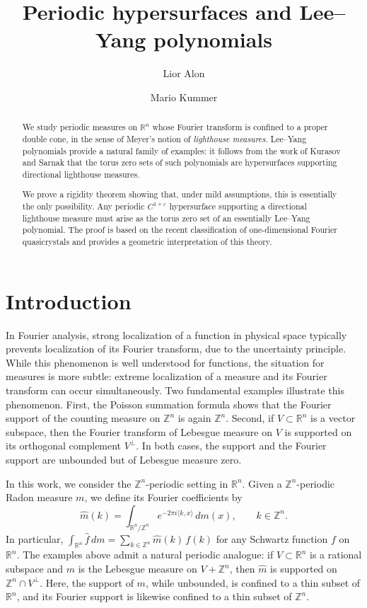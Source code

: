 \documentclass[11pt,letterpaper]{amsart}
\title[Periodic hypersurfaces and Lee--Yang polynomials]{Periodic hypersurfaces and Lee--Yang polynomials}
\author{Lior Alon}
\author{Mario Kummer}
\theoremstyle{definition}
\theoremstyle{plain}
\newcommand{\R}{{\mathbb R}}
\newcommand{\Z}{{\mathbb Z}}
\begin{document}
\begin{abstract}
We study periodic measures on $\R^n$ whose Fourier transform is 
confined to a proper double cone, in the sense of Meyer’s notion of 
\emph{lighthouse measures}. Lee--Yang polynomials provide a natural family of examples: it follows 
from the work of Kurasov and Sarnak that the torus zero sets of such 
polynomials are hypersurfaces supporting directional lighthouse measures.

We prove a rigidity theorem showing that, under mild assumptions, this 
is essentially the only possibility. Any periodic $C^{1+\varepsilon}$ hypersurface 
supporting a directional lighthouse measure must arise as the torus zero 
set of an essentially Lee--Yang polynomial.
The proof is based on the recent classification of one-dimensional 
Fourier quasicrystals and provides a geometric interpretation of this theory.
\end{abstract}
\maketitle


\section{Introduction}

In Fourier analysis, strong localization of a function in physical space
typically prevents localization of its Fourier transform, due to the uncertainty principle. 
While this phenomenon is well understood for functions, the situation for measures is more subtle: extreme localization of a measure and its Fourier transform can occur simultaneously.
Two fundamental examples illustrate this phenomenon. 
First, the Poisson summation formula shows that the Fourier support of the counting measure on $\Z^n$ is again $\Z^n$. 
Second, if $V \subset \R^n$ is a vector subspace, then the Fourier transform of Lebesgue measure on $V$ is supported on its orthogonal complement $V^\perp$. 
In both cases, the support and the Fourier support are unbounded but of Lebesgue measure zero.

In this work, we consider the $\Z^n$-periodic setting in $\R^n$. 
Given a $\Z^n$-periodic Radon measure $m$, we define its Fourier coefficients by
\[
\widehat{m}(k)=\int_{\R^n/\Z^n} e^{-2\pi i\langle k,x\rangle}\,dm(x),
\qquad k\in\Z^n.
\]
In particular, $\int_{\R^n} \hat{f}\,dm = \sum_{k\in\Z^n} \widehat{m}(k)\,f(k)$ for any Schwartz function $f$ on $\R^n$. 
The examples above admit a natural periodic analogue: if $V \subset \R^n$ is a rational subspace and $m$ is the Lebesgue measure on $V+\Z^n$, then $\widehat{m}$ is supported on $\Z^n \cap V^\perp$. 
Here, the support of $m$, while unbounded, is confined to a thin subset of $\R^n$, and its Fourier support is likewise confined to a thin subset of $\Z^n$.
\end{document}

